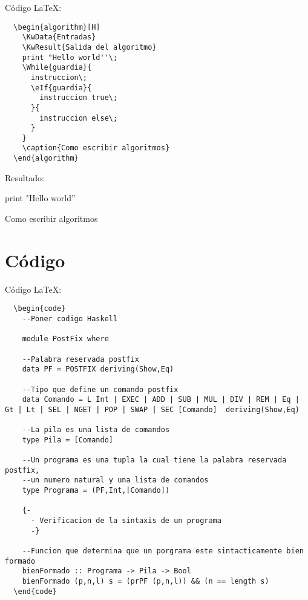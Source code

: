 \documentclass[spanish,12pt,letterpaper]{article}
\theoremstyle{break}
\begin{document}
Código \LaTeX:
\begin{verbatim}
  \begin{algorithm}[H]
    \KwData{Entradas}
    \KwResult{Salida del algoritmo}
    print "Hello world''\;
    \While{guardia}{
      instruccion\;
      \eIf{guardia}{
        instruccion true\;
      }{
        instruccion else\;
      }
    }
    \caption{Como escribir algoritmos}
  \end{algorithm}
\end{verbatim}

Resultado:\\
\begin{algorithm}[H]
  print "Hello world''\;
  \caption{Como escribir algoritmos}
\end{algorithm}

\section{Código}

Código \LaTeX:\\
\begin{verbatim}
  \begin{code}
    --Poner codigo Haskell
    
    module PostFix where

    --Palabra reservada postfix
    data PF = POSTFIX deriving(Show,Eq)

    --Tipo que define un comando postfix
    data Comando = L Int | EXEC | ADD | SUB | MUL | DIV | REM | Eq | Gt | Lt | SEL | NGET | POP | SWAP | SEC [Comando]  deriving(Show,Eq)

    --La pila es una lista de comandos
    type Pila = [Comando]

    --Un programa es una tupla la cual tiene la palabra reservada postfix,
    --un numero natural y una lista de comandos
    type Programa = (PF,Int,[Comando])

    {-
      - Verificacion de la sintaxis de un programa
      -}

    --Funcion que determina que un porgrama este sintacticamente bien formado
    bienFormado :: Programa -> Pila -> Bool
    bienFormado (p,n,l) s = (prPF (p,n,l)) && (n == length s) 
  \end{code}
\end{verbatim}
\end{document}
